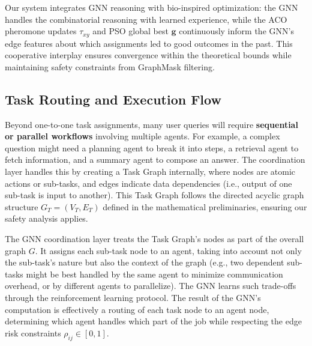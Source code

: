 \documentclass{article}
\begin{document}
Our system integrates GNN reasoning with bio-inspired optimization: the GNN handles the combinatorial reasoning with learned experience, while the ACO pheromone updates $\tau_{xy}$ and PSO global best $\mathbf{g}$ continuously inform the GNN's edge features about which assignments led to good outcomes in the past. This cooperative interplay ensures convergence within the theoretical bounds while maintaining safety constraints from GraphMask filtering.

\subsection{Task Routing and Execution Flow}

Beyond one-to-one task assignments, many user queries will require \textbf{sequential or parallel workflows} involving multiple agents. For example, a complex question might need a planning agent to break it into steps, a retrieval agent to fetch information, and a summary agent to compose an answer. The coordination layer handles this by creating a Task Graph internally, where nodes are atomic actions or sub-tasks, and edges indicate data dependencies (i.e., output of one sub-task is input to another). This Task Graph follows the directed acyclic graph structure $G_T = (V_T, E_T)$ defined in the mathematical preliminaries, ensuring our safety analysis applies.

The GNN coordination layer treats the Task Graph's nodes as part of the overall graph $G$. It assigns each sub-task node to an agent, taking into account not only the sub-task's nature but also the context of the graph (e.g., two dependent sub-tasks might be best handled by the same agent to minimize communication overhead, or by different agents to parallelize). The GNN learns such trade-offs through the reinforcement learning protocol. The result of the GNN's computation is effectively a routing of each task node to an agent node, determining which agent handles which part of the job while respecting the edge risk constraints $\rho_{ij} \in [0,1]$.

\end{document}
